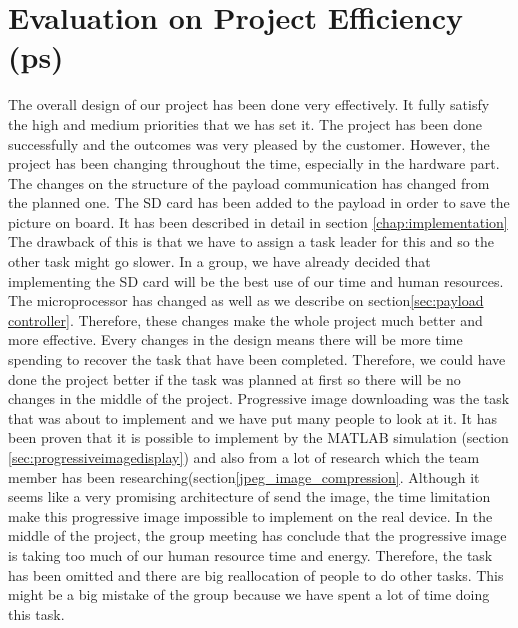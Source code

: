 
\section{Evaluation on Project Efficiency (ps)}
The overall design of our project has been done very effectively.
It fully satisfy the high and medium priorities that we has set it.
The project has been done successfully and the outcomes was very pleased by the customer.
However, the project has been changing throughout the time, especially in the hardware part.
The changes on the structure of the payload communication has changed from the planned one.
The SD card has been added to the payload in order to save the picture on board.
It has been described in detail in section \ref{chap:implementation}
The drawback of this is that we have to assign a task leader for this and so the other task might go slower.
In a group, we have already decided that implementing the SD card will be the best use of our time and human resources.
The microprocessor has changed as well as we describe on section\ref{sec:payload controller}.
Therefore, these changes make the whole project much better and more effective.
Every changes in the design means there will be more time spending to recover the task that have been completed. 
Therefore, we could have done the project better if the task was planned at first so there will be no changes in the middle of the project.
Progressive image downloading was the task that was about to implement and we have put many people to look at it. 
It has been proven that it is possible to implement by the MATLAB simulation (section \ref{sec:progressiveimagedisplay}) and also from a lot of research which the team member has been researching(section\ref{jpeg_image_compression}.
Although it seems like a very promising architecture of send the image, the time limitation make this progressive image impossible to implement on the real device.
In the middle of the project, the group meeting has conclude that the progressive image is taking too much of our human resource time and energy.
Therefore, the task has been omitted and there are big reallocation of people to do other tasks.
This might be a big mistake of the group because we have spent a lot of time doing this task.

